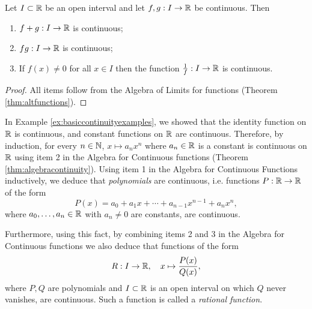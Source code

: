 \documentclass[../analysis1.tex]{subfiles}
\begin{document}
\begin{theorem}
\label{thm:algebracontinuity}
    \begin{shaded*}
        Let $I\subset\mathbb{R}$ be an open interval and let $f,g:I\to\mathbb{R}$ be continuous. Then
        \begin{enumerate}
            \item[1.] $f+g:I\to\mathbb{R}$ is continuous;
            \item[2.] $fg:I\to\mathbb{R}$ is continuous;
            \item[3.] If $f(x)\ne 0$ for all $x\in I$ then the function $\frac{1}{f}:I\to\mathbb{R}$ is continuous. 
        \end{enumerate}
    \end{shaded*}
\end{theorem}
\begin{proof}
    All items follow from the Algebra of Limits for functions (Theorem \ref{thm:altfunctions}).\qedhere
\end{proof}


\begin{example}
\label{ex:polycontinuity}
    In Example \ref{ex:basiccontinuityexamples}, we showed that the identity function on $\mathbb{R}$ is continuous, and constant functions on $\mathbb{R}$ are continuous. Therefore, by induction, for every $n\in\mathbb{N}$, $x\mapsto a_nx^n$ where $a_n\in\mathbb{R}$ is a constant is continuous on $\mathbb{R}$ using item 2 in the Algebra for Continuous functions (Theorem \ref{thm:algebracontinuity}). Using item 1 in the Algebra for Continuous Functions inductively, we deduce that \textit{polynomials} are continuous, i.e. functions $P:\mathbb{R}\to\mathbb{R}$ of the form
    \[P(x)=a_0+a_1x+\cdots+a_{n-1}x^{n-1}+a_nx^n,\]
    where $a_0,\dots,a_n\in\mathbb{R}$ with $a_n\ne 0$ are constants, are continuous.\par
    Furthermore, using this fact, by combining items 2 and 3 in the Algebra for Continuous functions we also deduce that functions of the form \[R:I\to\mathbb{R},\quad x\mapsto\frac{P(x)}{Q(x)},\]
    where $P,Q$ are polynomials and $I\subset\mathbb{R}$ is an open interval on which $Q$ never vanishes, are continuous. Such a function is called a \textit{rational function}.
\end{example}
\end{document}

